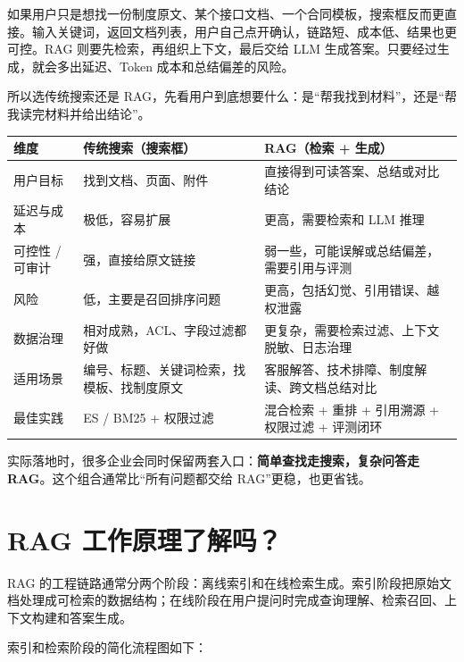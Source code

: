\documentclass[9pt,a4paper,twocolumn]{ctexart}
\begin{document}
如果用户只是想找一份制度原文、某个接口文档、一个合同模板，搜索框反而更直接。输入关键词，返回文档列表，用户自己点开确认，链路短、成本低、结果也更可控。RAG 则要先检索，再组织上下文，最后交给 LLM 生成答案。只要经过生成，就会多出延迟、Token 成本和总结偏差的风险。



所以选传统搜索还是 RAG，先看用户到底想要什么：是“帮我找到材料”，还是“帮我读完材料并给出结论”。


{\footnotesize
\begin{tabular}{|p{}|p{}|p{}|}
\hline
\textbf{维度} & \textbf{传统搜索（搜索框）} & \textbf{RAG（检索 + 生成）} \\
\hline
用户目标 & 找到文档、页面、附件 & 直接得到可读答案、总结或对比结论 \\
\hline
延迟与成本 & 极低，容易扩展 & 更高，需要检索和 LLM 推理 \\
\hline
可控性 / 可审计 & 强，直接给原文链接 & 弱一些，可能误解或总结偏差，需要引用与评测 \\
\hline
风险 & 低，主要是召回排序问题 & 更高，包括幻觉、引用错误、越权泄露 \\
\hline
数据治理 & 相对成熟，ACL、字段过滤都好做 & 更复杂，需要检索过滤、上下文脱敏、日志治理 \\
\hline
适用场景 & 编号、标题、关键词检索，找模板、找制度原文 & 客服解答、技术排障、制度解读、跨文档总结对比 \\
\hline
最佳实践 & ES / BM25 + 权限过滤 & 混合检索 + 重排 + 引用溯源 + 权限过滤 + 评测闭环 \\
\hline
\end{tabular}
}



实际落地时，很多企业会同时保留两套入口：\textbf{简单查找走搜索，复杂问答走 RAG}。这个组合通常比“所有问题都交给 RAG”更稳，也更省钱。



\section*{RAG 工作原理了解吗？}


RAG 的工程链路通常分两个阶段：离线索引和在线检索生成。索引阶段把原始文档处理成可检索的数据结构；在线阶段在用户提问时完成查询理解、检索召回、上下文构建和答案生成。



索引和检索阶段的简化流程图如下：
\end{document}
